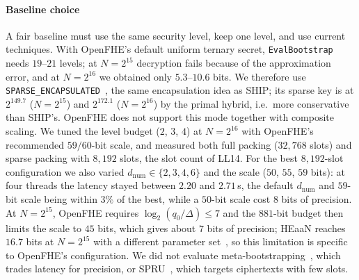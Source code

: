 \documentclass[sigconf,nonacm]{acmart}
\begin{document}
\paragraph{Baseline choice}
A fair baseline must use the same security level, keep one level, and use current techniques.
With OpenFHE's default uniform ternary secret, \texttt{EvalBootstrap} needs $19$--$21$ levels; at $N=2^{15}$ decryption fails because of the approximation error, and at $N=2^{16}$ we obtained only $5.3$--$10.6$ bits.
We therefore use \texttt{SPARSE\_ENCAPSULATED}~\cite{BTH22}, the same encapsulation idea as SHIP; its sparse key is at $2^{149.7}$ ($N=2^{15}$) and $2^{172.1}$ ($N=2^{16}$) by the primal hybrid, i.e.\ more conservative than SHIP's.
OpenFHE does not support this mode together with composite scaling.
We tuned the level budget ($2$, $3$, $4$) at $N=2^{16}$ with OpenFHE's recommended $59/60$-bit scale, and measured both full packing ($32{,}768$ slots) and sparse packing with $8{,}192$ slots, the slot count of LL14.
For the best $8{,}192$-slot configuration we also varied $d_{\mathrm{num}}\in\{2,3,4,6\}$ and the scale ($50$, $55$, $59$ bits): at four threads the latency stayed between $2.20$ and $2.71$\,s, the default $d_{\mathrm{num}}$ and $59$-bit scale being within $3\%$ of the best, while a $50$-bit scale cost $8$ bits of precision.
At $N=2^{15}$, OpenFHE requires $\log_2(q_0/\Delta)\le 7$ and the $881$-bit budget then limits the scale to $45$ bits, which gives about $7$ bits of precision; HEaaN reaches $16.7$ bits at $N=2^{15}$ with a different parameter set~\cite[Table~3]{CHKS25}, so this limitation is specific to OpenFHE's configuration.
We did not evaluate meta-bootstrapping~\cite{BCCKK22}, which trades latency for precision, or SPRU~\cite{SPRU25}, which targets ciphertexts with few slots.
\end{document}
